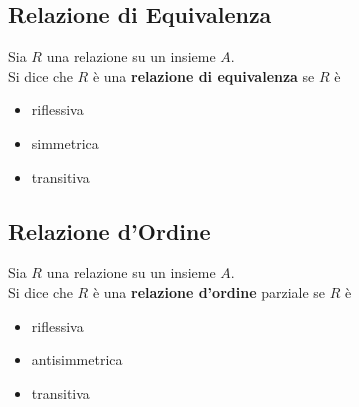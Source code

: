 \documentclass[a4paper,12pt, oneside]{book}
\begin{document}
\subsection{Relazione di Equivalenza}
\begin{definizione}
	Sia $R$ una relazione su un insieme $A$.\\
	Si dice che $R$ è una \textbf{relazione di equivalenza} se $R$ è
	\begin{itemize}
		\item riflessiva
		\item simmetrica
		\item transitiva
	\end{itemize}
\end{definizione}
\subsection{Relazione d'Ordine}
\begin{definizione}
	Sia $R$ una relazione su un insieme $A$.\\
	Si dice che $R$ è una \textbf{relazione d'ordine} parziale se $R$ è
	\begin{itemize}
		\item riflessiva
		\item antisimmetrica
		\item transitiva
	\end{itemize}
\end{definizione}
\end{document}
